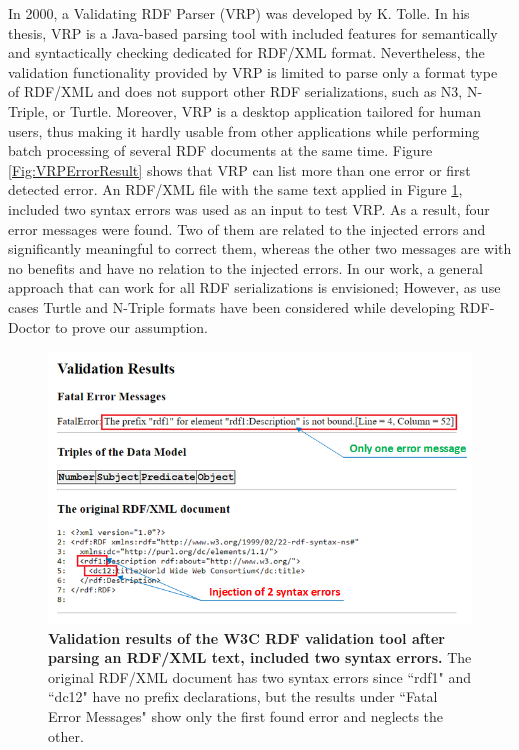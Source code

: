 In 2000, a Validating RDF Parser (VRP) \cite{karsten:Thesis:2000} was developed by K. Tolle. In his thesis, 
VRP is a Java-based parsing tool with included features for semantically and syntactically checking dedicated for RDF/XML format. 
Nevertheless, the validation functionality provided by VRP is limited to parse only a format type of RDF/XML and does not support other RDF serializations, such as N3, N-Triple, or Turtle. 
Moreover, VRP is a desktop application tailored for human users, thus making it hardly usable from other applications while performing batch processing of several RDF documents at the same time.
Figure \ref{Fig:VRPErrorResult} shows that VRP can list more than one error or first detected error. 
An RDF/XML file with the same text applied in Figure \ref{Fig:errorW3RDFValidator}, included two syntax errors was used as an input to test VRP. 
As a result, four error messages were found. Two of them are related to the injected errors and significantly meaningful to correct them, whereas the other two messages are with no benefits and have no relation to the injected errors. 
In our work, a general approach that can work for all RDF serializations is envisioned; However, as use cases Turtle and N-Triple formats have been considered while developing RDF-Doctor to prove our assumption. 
 
 \begin{figure}[ht]
		\begin{center}
			\includegraphics[scale=0.7,angle=0]{images/errorW3RDFValidator.png}
			\caption{\textbf{Validation results of the W3C RDF validation tool \cite{W3C:Validation:Online} after parsing an RDF/XML text, included two syntax errors.} The original RDF/XML document has two syntax errors since ``rdf1" and ``dc12" have no prefix declarations, but the results under ``Fatal Error Messages" show only the first found error and neglects the other.}
			\label{Fig:errorW3RDFValidator}
		\end{center}
	\end{figure}
